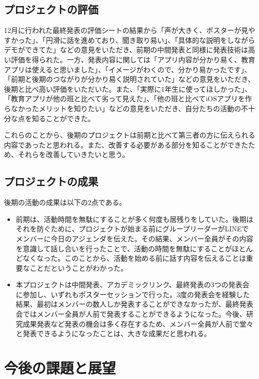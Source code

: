 \documentclass[openany,11pt,papersize]{jsbook}
\begin{document}
\section{プロジェクトの評価}
\par 12月に行われた最終発表の評価シートの結果から「声が大きく、ポスターが見やすかった」、「円滑に話を進めており、聞き取り易い」、「具体的な説明をしながらデモができてた」などの意見をいただき、前期の中間発表と同様に発表技術は高い評価を得られた。一方、発表内容に関しては「アプリ内容が分かり易く、教育アプリは使えると思いました」、「イメージがわくので、分かり易かったです」、「前期と後期のつながりが分かり易く説明されていた」などの意見をいただき、後期と比べ高い評価をいただいた。また、「実際に1年生に使ってほしかった」、「教育アプリが他の班と比べて劣って見えた」、「他の班と比べてiOSアプリを作らなかったメリットを知りたい」などの意見をいただき、自分たちの活動の不十分な点を知ることができた。
\par これらのことから、後期のプロジェクトは前期と比べて第三者の方に伝えられる内容であったと思われる。また、改善する必要がある部分を知ることができたため、それらを改善していきたいと思う。

\section{プロジェクトの成果}
\par 後期の活動の成果は以下の2点である。
\begin{itemize}
\item 前期は、活動時間を無駄にすることが多く何度も居残りをしていた。後期はそれを防ぐために、プロジェクトが始まる前にグループリーダーがLINEでメンバーに今日のアジェンダを伝えた。その結果、メンバー全員がその内容を意識して話し合いを行ったことで、活動の時間を無駄にすることがほとんどなくなった。このことから、活動を始める前に話す内容を伝えることは重要なことだということがわかった。
\item 
本プロジェクトは中間発表、アカデミックリンク、最終発表の3つの発表会に参加し、いずれもポスターセッションで行った。3度の発表会を経験した結果、最初はメンバーの数人しか発表することができなかったが、最終発表会ではメンバー全員が人前で発表することができるようになった。今後、研究成果発表など発表の機会は多く存在するため、メンバー全員が人前で堂々と発表できるようになったことは、大きな成果だと思われる。
\end{itemize}



\chapter{今後の課題と展望}
\end{document}
